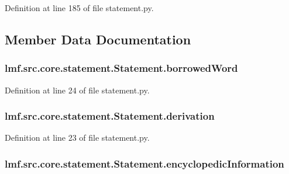 Definition at line 185 of file statement.\+py.



\subsection{Member Data Documentation}
\hypertarget{classlmf_1_1src_1_1core_1_1statement_1_1_statement_a534b2190fdea34d7f085a78adaac1ee2}{
\subsubsection[{borrowed\+Word}]{\setlength{\rightskip}{0pt plus 5cm}lmf.\+src.\+core.\+statement.\+Statement.\+borrowed\+Word}}\label{classlmf_1_1src_1_1core_1_1statement_1_1_statement_a534b2190fdea34d7f085a78adaac1ee2}


Definition at line 24 of file statement.\+py.

\hypertarget{classlmf_1_1src_1_1core_1_1statement_1_1_statement_afa73464513552afc8a6bf3828446a7d9}{
\subsubsection[{derivation}]{\setlength{\rightskip}{0pt plus 5cm}lmf.\+src.\+core.\+statement.\+Statement.\+derivation}}\label{classlmf_1_1src_1_1core_1_1statement_1_1_statement_afa73464513552afc8a6bf3828446a7d9}


Definition at line 23 of file statement.\+py.

\hypertarget{classlmf_1_1src_1_1core_1_1statement_1_1_statement_a3f6a8d066930ce775d6f6655ea5f3dfa}{
\subsubsection[{encyclopedic\+Information}]{\setlength{\rightskip}{0pt plus 5cm}lmf.\+src.\+core.\+statement.\+Statement.\+encyclopedic\+Information}}\label{classlmf_1_1src_1_1core_1_1statement_1_1_statement_a3f6a8d066930ce775d6f6655ea5f3dfa}


